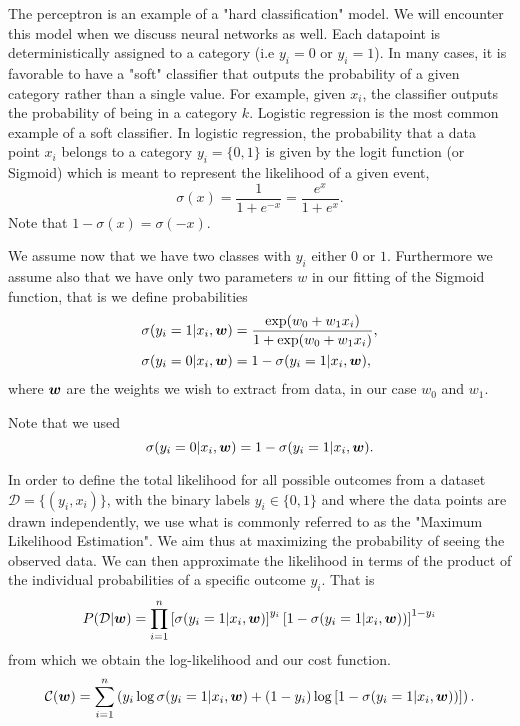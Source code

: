 The perceptron is an example of a "hard classification" model. 
We will encounter this model when we discuss neural networks as
well. Each datapoint is deterministically assigned to a category (i.e
$y_i=0$ or $y_i=1$). In many cases, it is favorable to have a "soft"
classifier that outputs the probability of a given category rather
than a single value. For example, given $x_i$, the classifier
outputs the probability of being in a category $k$.  Logistic regression
is the most common example of a soft classifier. In logistic regression, the 
probability that a data point $x_i$ belongs to a category $y_i=\{0,1\}$ is given 
by the logit function (or Sigmoid) which is meant to represent the likelihood of 
a given event,
\begin{equation}\label{eq:sigmoid}
	\sigma(x) = \frac{1}{1+e^{-x}}=\frac{e^{x}}{1+e^{x}}.
\end{equation}
Note that $1-\sigma(x) = \sigma(-x)$.

\noindent We assume now that we have two classes with $y_i$ either $0$ or $1$. 
Furthermore we assume also that we have only two parameters $w$ in our fitting 
of the Sigmoid function, that is we define probabilities 
\begin{align*}
\sigma(y_i=1|x_i,{\boldsymbol{w}}) &= \frac{\exp(w_0 + w_1x_i)}{1+\exp(w_0+w_1x_i)},\nonumber\\
\sigma(y_i=0|x_i,{\boldsymbol{w}}) &= 1 - \sigma(y_i=1|x_i,{\boldsymbol{w}}),
\end{align*}
where ${\boldsymbol{w}}$ are the weights we wish to extract from data, in our case $w_0$ and $w_1$. 

\noindent Note that we used
\begin{equation}
	\sigma(y_i=0\vert x_i, {\boldsymbol{w}}) = 1-\sigma(y_i=1\vert x_i, {\boldsymbol{w}}).
\end{equation}

In order to define the total likelihood for all possible outcomes from a  
dataset $\mathcal{D}=\{(y_i,x_i)\}$, with the binary labels
$y_i\in\{0,1\}$ and where the data points are drawn independently, we use
what is commonly referred to as the "Maximum Likelihood Estimation".
We aim thus at maximizing the probability of seeing the observed data. 
We can then approximate the likelihood in terms of the product of the individual
probabilities of a specific outcome $y_i$. That is 
\begin{align*}
P(\mathcal{D}|{\boldsymbol{w}})& = \prod_{i=1}^n \left[\sigma(y_i=1|x_i,{\boldsymbol{w}})\right]^{y_i}\left[1-\sigma(y_i=1|x_i,{\boldsymbol{w}}))\right]^{1-y_i}\nonumber \\
\end{align*}
from which we obtain the log-likelihood and our cost function.
\begin{equation}
	\mathcal{C}({\boldsymbol{w}}) = \sum_{i=1}^n \left( y_i\log{\sigma(y_i=1|x_i,{\boldsymbol{w}})} + (1-y_i)\log\left[1-\sigma(y_i=1|x_i,{\boldsymbol{w}}))\right]\right).
\end{equation}

